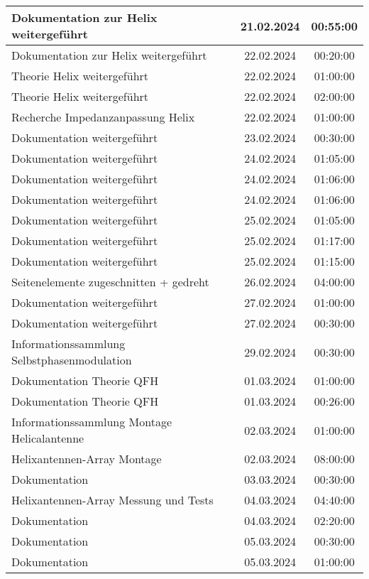 \begin{longtable}{|l|c|c|}
	\hline
	Dokumentation zur Helix weitergeführt & 21.02.2024 & 00:55:00 \\
	\hline
	Dokumentation zur Helix weitergeführt & 22.02.2024 & 00:20:00 \\
	\hline
	Theorie Helix weitergeführt & 22.02.2024 & 01:00:00 \\
	\hline
	Theorie Helix weitergeführt & 22.02.2024 & 02:00:00 \\
	\hline
	Recherche Impedanzanpassung Helix & 22.02.2024 & 01:00:00 \\
	\hline
	Dokumentation weitergeführt & 23.02.2024 & 00:30:00 \\
	\hline
	Dokumentation weitergeführt & 24.02.2024 & 01:05:00 \\
	\hline
	Dokumentation weitergeführt & 24.02.2024 & 01:06:00 \\
	\hline
	Dokumentation weitergeführt & 24.02.2024 & 01:06:00 \\
	\hline
	Dokumentation weitergeführt & 25.02.2024 & 01:05:00 \\
	\hline
	Dokumentation weitergeführt & 25.02.2024 & 01:17:00 \\
	\hline
	Dokumentation weitergeführt & 25.02.2024 & 01:15:00 \\
	\hline
	Seitenelemente zugeschnitten + gedreht & 26.02.2024 & 04:00:00 \\
	\hline
	Dokumentation weitergeführt & 27.02.2024 & 01:00:00 \\
	\hline
	Dokumentation weitergeführt & 27.02.2024 & 00:30:00 \\
	\hline
	Informationssammlung Selbstphasenmodulation & 29.02.2024 & 00:30:00 \\
	\hline
	Dokumentation Theorie QFH & 01.03.2024 & 01:00:00 \\
	\hline
	Dokumentation Theorie QFH & 01.03.2024 & 00:26:00 \\
	\hline
	Informationssammlung Montage Helicalantenne & 02.03.2024 & 01:00:00 \\
	\hline
	Helixantennen-Array Montage & 02.03.2024 & 08:00:00 \\
	\hline
	Dokumentation & 03.03.2024 & 00:30:00 \\
	\hline
	Helixantennen-Array Messung und Tests & 04.03.2024 & 04:40:00 \\
	\hline
	Dokumentation & 04.03.2024 & 02:20:00 \\
	\hline
	Dokumentation & 05.03.2024 & 00:30:00 \\
	\hline
	Dokumentation & 05.03.2024 & 01:00:00 \\

\end{longtable}
